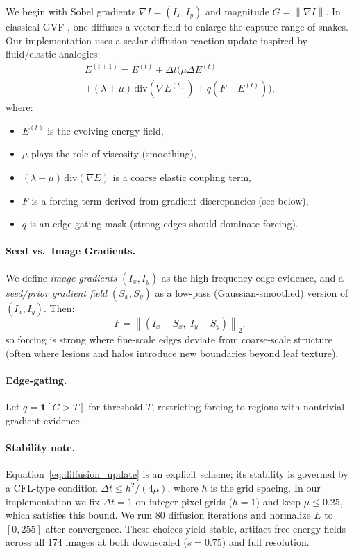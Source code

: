 \documentclass[11pt,a4paper]{article}
\newcommand{\grad}{\nabla}
\newcommand{\lap}{\Delta}
\newcommand{\norm}[1]{\left\lVert #1 \right\rVert}
\begin{document}
We begin with Sobel gradients $\grad I = (I_x, I_y)$ and magnitude $G = \norm{\grad I}$. In classical GVF \citep{xu1998gvf}, one diffuses a vector field to enlarge the capture range of snakes. Our implementation uses a scalar diffusion-reaction update inspired by fluid/elastic analogies:
\begin{multline}
E^{(t+1)} = E^{(t)} + \Delta t \Big( \mu \lap E^{(t)} \\
 + (\lambda{+}\mu)\,\mathrm{div}(\grad E^{(t)}) + q(F {-} E^{(t)}) \Big),
\label{eq:diffusion_update}
\end{multline}
where:
\begin{itemize}
    \item $E^{(t)}$ is the evolving energy field,
    \item $\mu$ plays the role of viscosity (smoothing),
    \item $(\lambda+\mu)\,\mathrm{div}(\grad E)$ is a coarse elastic coupling term,
    \item $F$ is a forcing term derived from gradient discrepancies (see below),
    \item $q$ is an edge-gating mask (strong edges should dominate forcing).
\end{itemize}

\paragraph{Seed vs.\ Image Gradients.}
We define \emph{image gradients} $(I_x,I_y)$ as the high-frequency edge evidence, and a \emph{seed/prior gradient field} $(S_x,S_y)$ as a low-pass (Gaussian-smoothed) version of $(I_x,I_y)$. Then:
\begin{equation}
F = \norm{(I_x-S_x,\; I_y-S_y)}_2,
\end{equation}
so forcing is strong where fine-scale edges deviate from coarse-scale structure (often where lesions and halos introduce new boundaries beyond leaf texture).

\paragraph{Edge-gating.}
Let $q = \mathbf{1}[G > T]$ for threshold $T$, restricting forcing to regions with nontrivial gradient evidence.

\paragraph{Stability note.}
Equation~\eqref{eq:diffusion_update} is an explicit scheme; its stability is governed by a CFL-type condition $\Delta t \leq h^2/(4\mu)$, where $h$ is the grid spacing. In our implementation we fix $\Delta t = 1$ on integer-pixel grids ($h=1$) and keep $\mu\leq 0.25$, which satisfies this bound. We run 80 diffusion iterations and normalize $E$ to $[0,255]$ after convergence. These choices yield stable, artifact-free energy fields across all 174 images at both downscaled ($s{=}0.75$) and full resolution.
\end{document}
